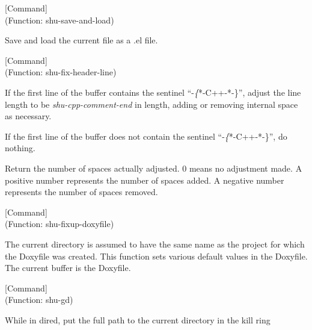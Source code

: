 \vspace{1em}
\noindent
{}
\usebox{\funcname}
 \hfill [Command]\\%
 (Function: shu-save-and-load)

\begin{doc-string}
Save and load the current file as a .el file.
\end{doc-string}

\vspace{1em}
\noindent
{}
\usebox{\funcname}
 \hfill [Command]\\%
 (Function: shu-fix-header-line)

\begin{doc-string}
If the first line of the buffer contains the sentinel ``-\emph\{*-C++-*-\}'', adjust
the line length to be \emph{shu-cpp-comment-end} in length, adding or removing
internal space as necessary.

If the first line of the buffer does not contain the sentinel ``-\emph\{*-C++-*-\}'',
do nothing.

Return the number of spaces actually adjusted.  0 means no adjustment made.
A positive number represents the number of spaces added.  A negative number
represents the number of spaces removed.
\end{doc-string}

\vspace{1em}
\noindent
{}
\usebox{\funcname}
 \hfill [Command]\\%
 (Function: shu-fixup-doxyfile)

\begin{doc-string}
The current directory is assumed to have the same name as the project for
which the Doxyfile was created.  This function sets various default values in
the Doxyfile.  The current buffer is the Doxyfile.
\end{doc-string}

\vspace{1em}
\noindent
{}
\usebox{\funcname}
 \hfill [Command]\\%
 (Function: shu-gd)

\begin{doc-string}
While in dired, put the full path to the current directory in the kill ring
\end{doc-string}

